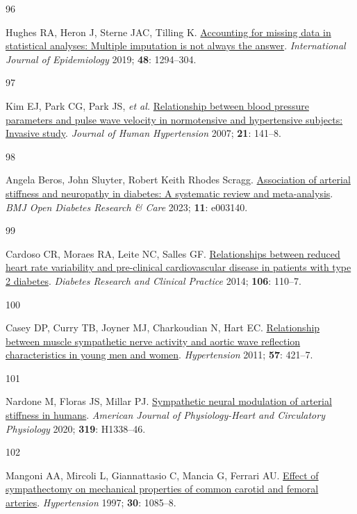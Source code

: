 \documentclass[
  letterpaper,
  headsepline=true,
  open=any]{scrbook}
\newlength{\cslhangindent}
\newlength{\csllabelwidth}
\newlength{\cslentryspacingunit} %
\newenvironment{CSLReferences}[2] %
 {%
  \setlength{\parindent}{0pt}
  \ifodd #1
  \let\oldpar\par
  \def\par{\hangindent=\cslhangindent\oldpar}
  \fi
  \setlength{\parskip}{#2\cslentryspacingunit}
 }%
 {}
\newcommand{\CSLLeftMargin}[1]{\parbox[t]{\csllabelwidth}{#1}}
\newcommand{\CSLRightInline}[1]{\parbox[t]{\linewidth - \csllabelwidth}{#1}\break}
\begin{document}
\begin{CSLReferences}{0}{0}
\leavevmode{}%
\CSLLeftMargin{96 }%
\CSLRightInline{Hughes RA, Heron J, Sterne JAC, Tilling K.
\href{https://doi.org/10.1093/ije/dyz032}{Accounting for missing data in
statistical analyses: Multiple imputation is not always the answer}.
\emph{International Journal of Epidemiology} 2019; \textbf{48}:
1294--304.}

\leavevmode{}%
\CSLLeftMargin{97 }%
\CSLRightInline{Kim EJ, Park CG, Park JS, \emph{et al.}
\href{https://doi.org/10.1038/sj.jhh.1002120}{Relationship between blood
pressure parameters and pulse wave velocity in normotensive and
hypertensive subjects: Invasive study}. \emph{Journal of Human
Hypertension} 2007; \textbf{21}: 141--8.}

\leavevmode{}%
\CSLLeftMargin{98 }%
\CSLRightInline{Angela Beros, John Sluyter, Robert Keith Rhodes Scragg.
\href{https://doi.org/10.1136/bmjdrc-2022-003140}{Association of
arterial stiffness and neuropathy in diabetes: A systematic review and
meta-analysis}. \emph{BMJ Open Diabetes Research \& Care} 2023;
\textbf{11}: e003140.}

\leavevmode{}%
\CSLLeftMargin{99 }%
\CSLRightInline{Cardoso CR, Moraes RA, Leite NC, Salles GF.
\href{https://doi.org/10.1016/j.diabres.2014.07.005}{Relationships
between reduced heart rate variability and pre-clinical cardiovascular
disease in patients with type 2 diabetes}. \emph{Diabetes Research and
Clinical Practice} 2014; \textbf{106}: 110--7.}

\leavevmode{}%
\CSLLeftMargin{100 }%
\CSLRightInline{Casey DP, Curry TB, Joyner MJ, Charkoudian N, Hart EC.
\href{https://doi.org/10.1161/HYPERTENSIONAHA.110.164517}{Relationship
between muscle sympathetic nerve activity and aortic wave reflection
characteristics in young men and women}. \emph{Hypertension} 2011;
\textbf{57}: 421--7.}

\leavevmode{}%
\CSLLeftMargin{101 }%
\CSLRightInline{Nardone M, Floras JS, Millar PJ.
\href{https://doi.org/10.1152/ajpheart.00734.2020}{Sympathetic neural
modulation of arterial stiffness in humans}. \emph{American Journal of
Physiology-Heart and Circulatory Physiology} 2020; \textbf{319}:
H1338--46.}

\leavevmode{}%
\CSLLeftMargin{102 }%
\CSLRightInline{Mangoni AA, Mircoli L, Giannattasio C, Mancia G, Ferrari
AU. \href{https://doi.org/10.1161/01.HYP.30.5.1085}{Effect of
sympathectomy on mechanical properties of common carotid and femoral
arteries}. \emph{Hypertension} 1997; \textbf{30}: 1085--8.}


\end{CSLReferences}
\end{document}
